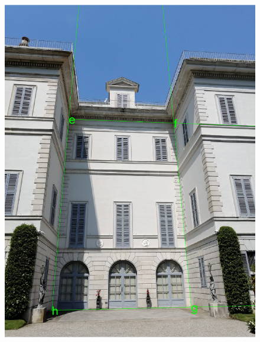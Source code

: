 \documentclass[11pt, oneside]{article}
\begin{document}
\begin{figure}[!h]
	\centering
	\begin{minipage}{.45\textwidth}
		\centering
		\includegraphics[scale = 0.4]{image_original_two_vertical_vp.png}
		\label{image_two_original_vertical_vp}
	\end{minipage}%
	\quad
	\begin{minipage}{.5\textwidth}
		\centering

\end{minipage}
\end{figure}
\end{document}
